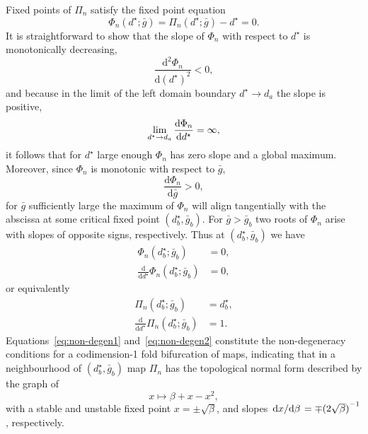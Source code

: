 \documentclass[12pt,authoryear]{elsarticle}
\renewcommand{\d}{\mathrm{d}}
\newcommand{\dstar}{d^\star}
\newcommand{\gbar}{\bar g}
\newcommand{\Phin}{\Phi_n}
\begin{document}
Fixed points of $\Pi_{n}$ satisfy the fixed point equation
\begin{equation}
  \Phi_{n}(\dstar; \gbar)= \Pi_{n}(\dstar; \gbar) - \dstar = 0.
\end{equation}
It is straightforward to show that the slope of $\Phi_{n}$ with respect to $\dstar$ is monotonically decreasing,
\begin{equation}\label{eq:non-degen1}
  \frac{\d^{2}\Phi_{n}}{\d{(d^{\star})}^{2}}<0,
\end{equation}
and because in the limit of the left domain boundary $\dstar \to d_{a}$ the slope is positive,
\begin{equation}
  \lim_{\dstar \to d_{a}}\dv{\Phin}{\dstar} = \infty,
\end{equation}
it follows that for $\dstar$ large enough $\Phin$ has zero slope and a
global maximum.
Moreover, since $\Phin$ is monotonic with respect to $\gbar$,
\begin{equation}\label{eq:non-degen2}
  \frac{\d \Phi_{n}}{\d \gbar}>0,
\end{equation}
for $\gbar$ sufficiently large the maximum of $\Phin$ will align tangentially with the abscissa at some critical fixed point $(\dstar_{b}, \gbar_{b})$.
For $\gbar > \gbar_{b}$ two roots of $\Phin$ arise with slopes of opposite signs, respectively.
Thus at $(\dstar_{b}, \gbar_{b})$ we have
\begin{align}
  \Phi_{n}(\dstar_{b}; \gbar_{b}) &=0,\\
  \frac{\d}{\d \dstar}\Phi_{n}(\dstar_{b}; \gbar_{b})&=0,
\end{align}
or equivalently
\begin{align}
  \Pi_{n}(\dstar_{b}; \gbar_{b}) &=\dstar_{b},\\
  \frac{\d}{\d \dstar}\Pi_{n}(\dstar_{b}; \gbar_{b})&=1.
\end{align}
Equations~\eqref{eq:non-degen1} and~\eqref{eq:non-degen2} constitute the non-degeneracy conditions for a codimension-1 fold bifurcation of maps, indicating that in a neighbourhood of $(\dstar_{b}, \gbar_{b})$ map $\Pi_{n}$ has the topological normal form described by the graph of
\begin{equation}
x\mapsto \beta+x-x^{2},
\end{equation}
with a stable and unstable fixed point $x=\pm\sqrt{\beta}$, and slopes $\dv*{x}{\beta}=\mp {(2\sqrt{\beta})}^{-1}$, respectively.
\end{document}
